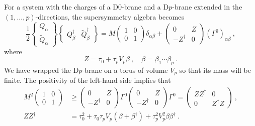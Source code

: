 For a system with the charges of a D0-brane and a D$p$-brane extended in the $(1,\dots,p)$-directions, the supersymmetry algebra becomes
\begin{equation}
	\frac{1}{2}\begin{Bmatrix} Q_\alpha \\ \tilde{Q}_\alpha \end{Bmatrix}\begin{Bmatrix} Q_\beta^\dagger & \tilde{Q}_\beta^\dagger \end{Bmatrix} = M\begin{pmatrix} 1 & 0 \\ 0 & 1 \end{pmatrix}\delta_{\alpha\beta} + \begin{pmatrix} 0 & Z \\ -Z^\dagger & 0 \end{pmatrix}(\Gamma^0)_{\alpha\beta} \:, \label{13.6.15}
\end{equation}
where
\begin{equation}
	Z = \tau_0 + \tau_p V_p\beta \:, \quad \beta = \beta_1\cdots\beta_p \:. \label{13.6.16}
\end{equation}
We have wrapped the D$p$-brane on a torus of volume $V_p$ so that its mass will be finite. The positivity of the left-hand side implies that
\begin{subequations} \label{13.6.17}
	\begin{align}
		M^2\begin{pmatrix} 1 & 0 \\ 0 & 1 \end{pmatrix} &\ge \begin{pmatrix} 0 & Z \\ -Z^\dagger & 0 \end{pmatrix}\Gamma^0\begin{pmatrix} 0 & Z \\ -Z^\dagger & 0 \end{pmatrix}\Gamma^0 = \begin{pmatrix} ZZ^\dagger & 0 \\ 0 & Z^\dagger Z \end{pmatrix} \:, \label{13.6.17a} \\
		ZZ^\dagger &= \tau_0^2 + \tau_0\tau_p V_p(\beta + \beta^\dagger) + \tau_p^2 V_p^2\beta\beta^\dagger \:. \label{13.6.17b}
	\end{align}
\end{subequations}

